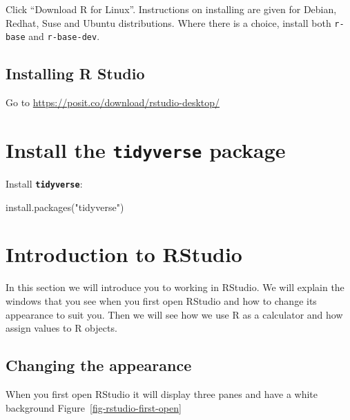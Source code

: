 \documentclass[
  letterpaper,
  DIV=11,
  numbers=noendperiod]{scrreprt}
\newenvironment{Shaded}{\begin{snugshade}}{\end{snugshade}}
\newcommand{\FunctionTok}[1]{\textcolor[rgb]{0.28,0.35,0.67}{#1}}
\newcommand{\NormalTok}[1]{\textcolor[rgb]{0.00,0.23,0.31}{#1}}
\newcommand{\StringTok}[1]{\textcolor[rgb]{0.13,0.47,0.30}{#1}}
\begin{document}
Click ``Download R for Linux''. Instructions on installing are given for
Debian, Redhat, Suse and Ubuntu distributions. Where there is a choice,
install both \texttt{r-base} and \texttt{r-base-dev}.

\hypertarget{installing-r-studio}{%
\subsection{Installing R Studio}\label{installing-r-studio}}

Go to \url{https://posit.co/download/rstudio-desktop/}

\hypertarget{install-the-tidyverse-package}{%
\section{\texorpdfstring{Install the \textbf{\texttt{tidyverse}}
package}{Install the tidyverse package}}\label{install-the-tidyverse-package}}

Install \textbf{\texttt{tidyverse}}:

\begin{Shaded}
\begin{Highlighting}[]
\FunctionTok{install.packages}\NormalTok{(}\StringTok{"tidyverse"}\NormalTok{)}
\end{Highlighting}
\end{Shaded}

\hypertarget{introduction-to-rstudio}{%
\section{Introduction to RStudio}\label{introduction-to-rstudio}}

In this section we will introduce you to working in RStudio. We will
explain the windows that you see when you first open RStudio and how to
change its appearance to suit you. Then we will see how we use R as a
calculator and how assign values to R objects.

\hypertarget{changing-the-appearance}{%
\subsection{Changing the appearance}\label{changing-the-appearance}}

When you first open RStudio it will display three panes and have a white
background Figure~\ref{fig-rstudio-first-open}
\end{document}
